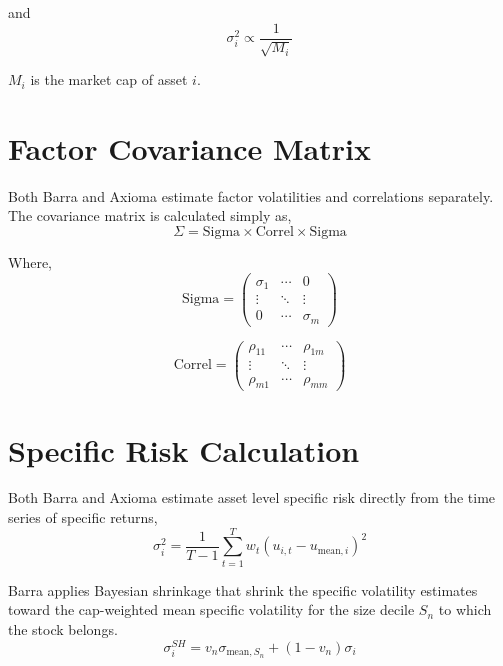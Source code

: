 \documentclass{article}
\begin{document}
and 
\begin{equation}
\sigma_i^2 \propto \frac{1}{\sqrt{M_i}}
\end{equation}

\( M_i \) is the market cap of asset \( i \).

\section*{Factor Covariance Matrix}
Both Barra and Axioma estimate factor volatilities and correlations separately. The covariance matrix is calculated simply as,
\begin{equation}
\Sigma = \text{Sigma} \times \text{Correl} \times \text{Sigma}
\end{equation}

Where,
\begin{equation}
\text{Sigma} = \begin{pmatrix}
\sigma_1 & \cdots & 0 \\
\vdots & \ddots & \vdots \\
0 & \cdots & \sigma_m
\end{pmatrix}
\end{equation}

\begin{equation}
\text{Correl} = \begin{pmatrix}
\rho_{11} & \cdots & \rho_{1m} \\
\vdots & \ddots & \vdots \\
\rho_{m1} & \cdots & \rho_{mm}
\end{pmatrix}
\end{equation}


\section*{Specific Risk Calculation}
Both Barra and Axioma estimate asset level specific risk directly from the time series of specific returns,
\begin{equation}
\sigma_i^2 = \frac{1}{T-1} \sum_{t=1}^{T} w_t \left( u_{i,t} - u_{\text{mean},i} \right)^2
\end{equation}

Barra applies Bayesian shrinkage that shrink the specific volatility estimates toward the cap-weighted mean specific volatility for the size decile \( S_n \) to which the stock belongs.
\begin{equation}
\sigma_i^{SH} = v_n \sigma_{\text{mean}, S_n} + (1 - v_n) \sigma_i
\end{equation}
\end{document}
